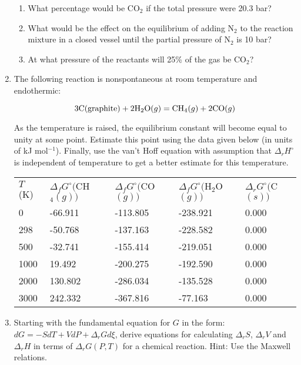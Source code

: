 \begin{enumerate}
\begin{enumerate}
\item What percentage would be CO$_2$ if the total pressure were 20.3 bar?
\item What would be the effect on the equilibrium of adding N$_2$ to the reaction mixture in a closed vessel until the partial pressure of N$_2$ is 10 bar?
\item At what pressure of the reactants will 25\% of the gas be CO$_2$?
\end{enumerate}


\item The following reaction is nonspontaneous at room temperature and endothermic:

$$3\textnormal{C}(\textnormal{graphite}) + 2\textnormal{H}_2\textnormal{O}(g) = \textnormal{CH}_4(g) + 2\textnormal{CO}(g)$$

As the temperature is raised, the equilibrium constant will become equal to unity at some point. Estimate this point using the data given below (in units of kJ mol$^{-1}$). Finally, use the van't Hoff equation with assumption that $\Delta_rH^\circ$ is independent of temperature to get a better estimate for this temperature.

\begin{tabular}{lllll}
$T$ (K) & $\Delta_fG^\circ($CH$_4(g))$ & $\Delta_fG^\circ($CO$(g))$ & $\Delta_fG^\circ($H$_2$O$(g))$ & $\Delta_rG^\circ($C$(s))$\\
0    & -66.911 & -113.805 & -238.921 & 0.000\\
298  & -50.768 & -137.163 & -228.582 & 0.000\\
500  & -32.741 & -155.414 & -219.051 & 0.000\\
1000 & 19.492  & -200.275 & -192.590 & 0.000\\
2000 & 130.802 & -286.034 & -135.528 & 0.000\\
3000 & 242.332 & -367.816 & -77.163  & 0.000\\
\end{tabular}


\item Starting with the fundamental equation for $G$ in the form: $dG = -SdT + VdP + \Delta_rGd\xi$, derive equations for calculating $\Delta_rS$, $\Delta_rV$ and $\Delta_rH$ in terms of $\Delta_rG(P,T)$ for a chemical reaction. Hint: Use the Maxwell relations.


\end{enumerate}
